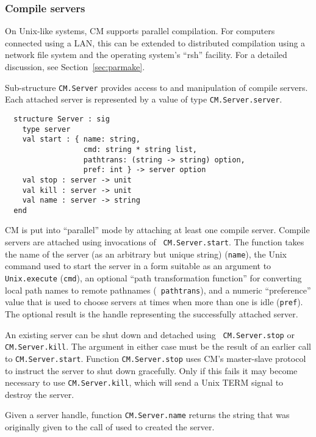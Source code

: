 \documentclass[titlepage,letterpaper]{article}
\begin{document}
\subsubsection*{Compile servers}

On Unix-like systems, CM supports parallel compilation.  For computers
connected using a LAN, this can be extended to distributed compilation
using a network file system and the operating system's ``rsh''
facility.  For a detailed discussion, see Section~\ref{sec:parmake}.

Sub-structure {\tt CM.Server} provides access to and manipulation of
compile servers.  Each attached server is represented by a value of
type {\tt CM.Server.server}.

\begin{verbatim}
  structure Server : sig
    type server
    val start : { name: string,
                  cmd: string * string list,
                  pathtrans: (string -> string) option,
                  pref: int } -> server option
    val stop : server -> unit
    val kill : server -> unit
    val name : server -> string
  end
\end{verbatim}

CM is put into ``parallel'' mode by attaching at least one compile
server.  Compile servers are attached using invocations of {\tt
CM.Server.start}.  The function takes the name of the server (as an
arbitrary but unique string) ({\tt name}), the Unix command used to
start the server in a form suitable as an argument to {\tt
Unix.execute} ({\tt cmd}), an optional ``path transformation
function'' for converting local path names to remote pathnames ({\tt
pathtrans}), and a numeric ``preference'' value that is used to choose
servers at times when more than one is idle ({\tt pref}).  The
optional result is the handle representing the successfully attached
server.

An existing server can be shut down and detached using {\tt
CM.Server.stop} or {\tt CM.Server.kill}.  The argument in either case
must be the result of an earlier call to {\tt CM.Server.start}.
Function {\tt CM.Server.stop} uses CM's master-slave protocol to
instruct the server to shut down gracefully.  Only if this fails it
may become necessary to use {\tt CM.Server.kill}, which will send a
Unix TERM signal to destroy the server.

Given a server handle, function {\tt CM.Server.name} returns the
string that was originally given to the call of used to created the server.
\end{document}
